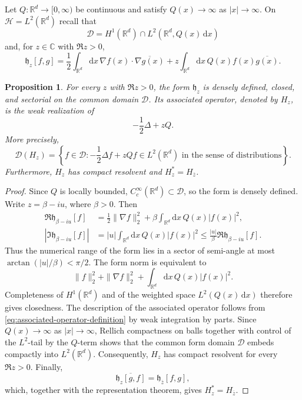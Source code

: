 \documentclass[11pt,reqno]{amsart}
\newtheorem{proposition}[theorem]{Proposition}
\theoremstyle{definition}
\numberwithin{equation}{section}
\newcommand{\<}{\langle}
\renewcommand{\>}{\rangle}
\def\de{{\rm d}}
\def\de{{\mathrm {d}}}
\begin{document}
\begin{appendix}
Let $Q:\mathbb R^d\to[0,\infty)$ be continuous and satisfy
$Q(x)\to\infty$ as $|x|\to\infty$.  On $\mathcal H=L^2(\mathbb R^d)$ recall that
\[
  \mathcal D
  =H^1(\mathbb R^d)\cap L^2(\mathbb R^d,Q(x)\,\de x)
\]
and, for $z\in\mathbb C$ with $\Re z>0$,
\begin{equation}
  \mathfrak h_z[f,g]
  =\frac12\int_{\mathbb R^d} \de x \,\nabla f(x)\cdot\overline{\nabla g(x)}
     +z\int_{\mathbb R^d}\de x \, Q(x)f(x)\overline{g(x)}.
  \nonumber
\end{equation}

\begin{proposition}
\label{prop:closed-sectorial-app}
For every $z$ with $\Re z>0$, the form $\mathfrak h_z$ is
densely defined, closed, and sectorial on the common domain $\mathcal D$.
Its associated operator, denoted by $H_z$, is the weak realization of
\[
       -\frac12\Delta+zQ.
\]
More precisely,
\[
 \mathcal D(H_z)
 =\left\{f\in\mathcal D:
 -\frac12\Delta f+zQf\in L^2(\mathbb R^d)
 \text{ in the sense of distributions}\right\}.
\]
Furthermore,  $H_z $ has compact resolvent and $H_z^*=H_{\overline z}$.
\end{proposition}

\begin{proof}
Since $Q$ is locally bounded,
$C_c^\infty(\mathbb R^d)\subset\mathcal D$, so the form is densely defined.
Write $z=\beta-iu$, where $\beta>0$.  Then
\begin{align}
    \nonumber
 \Re \mathfrak h_{\beta-iu}[f]
 &=\frac12\|\nabla f\|_2^2+\beta\int_{\mathbb R^d} \de x \, Q(x) |f(x)|^2,
 \\
 |\Im\mathfrak h_{\beta-iu}[f]|
 &=|u|\int_{\mathbb R^d} \de x \, Q(x)|f(x)|^2
 \leq\frac{|u|}{\beta}
       \Re \mathfrak h_{\beta-iu}[f].
 \nonumber
\end{align}
Thus the numerical range of the form lies in a sector of semi-angle at most
$\arctan(|u|/\beta)<\pi/2$.
The form norm is equivalent to
\[
  \|f\|_2^2+\|\nabla f\|_2^2+\int_{\mathbb R^d} \de x \, Q(x)|f(x)|^2.
\]
Completeness of $H^1(\mathbb R^d)$ and of the weighted space
$L^2(Q(x)\,\de x)$ therefore gives closedness. The description of the associated
operator follows from \eqref{eq:associated-operator-definition} by weak
integration by parts.
Since  $Q(x)\to\infty $ as  $|x|\to\infty $, Rellich compactness on balls together with control of the $L^2$-tail by the $Q$-term shows that the common form domain  $\mathcal D $ embeds compactly into  $L^2(\mathbb R^d) $. Consequently,  $H_z $ has compact resolvent for every  $\Re z>0 $.
Finally,
\[
  \overline{\mathfrak h_z[g,f]}=\mathfrak h_{\overline z}[f,g],
\]
which, together with the representation theorem, gives
$H_z^*=H_{\overline z}$.
\end{proof}


\end{appendix}
\end{document}
